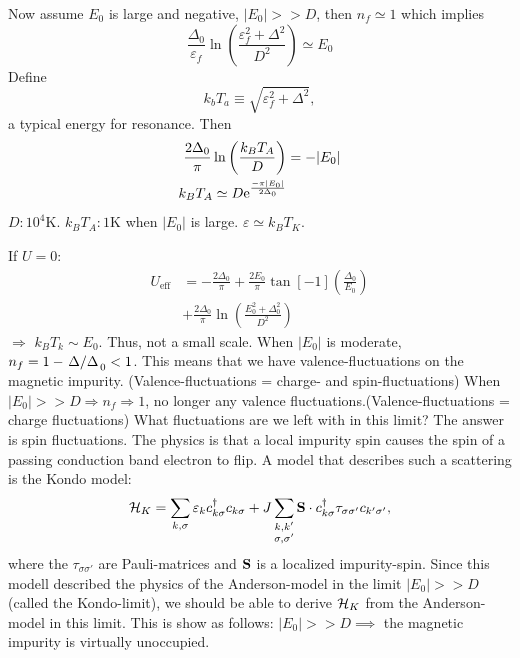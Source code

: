 Now assume $E_0$ is large and negative, $|E_0|>>D$, then $n_f \simeq 1$ which implies
\begin{equation*}
	\frac{\Delta_0}{\varepsilon_f}\ln\left(\frac{\varepsilon_f^2 + \Delta^2}{D^2}\right) \simeq E_0
\end{equation*}
Define 
\begin{equation}
	k_bT_a \equiv \sqrt{\varepsilon_f^2 + \Delta^2},
\end{equation}
a typical energy for resonance. Then
\begin{align*}
\frac{2\Delta_0}{\pi}\ln\left(\frac{k_BT_A}{D}\right) &= -|E_0| \\
k_BT_A\simeq D\mathrm{e}^{\frac{-\pi|E_0|}{2\Delta_0}}
\end{align*}
$D: 10^4\mathrm{K}$. $k_BT_A: 1\mathrm{K}$ when $|E_0|$ is large. $\varepsilon\simeq k_BT_K$.

If $U=0$: 
\begin{align}
	U_\text{eff} &= -\frac{2\Delta_0}{\pi} + \frac{2E_0}{\pi}\tan[-1](\frac{\Delta_0}{E_0}) \\
	&+\frac{2\Delta_0}{\pi}\ln\left(\frac{E_0^2 + \Delta_0^2}{D^2}\right)
\end{align}
$\Rightarrow$ $k_BT_k \sim E_0$. Thus, not a small scale. When $|E_0|$ is moderate, $n_f = 1-\flatfrac{\Delta}\Delta_0<1$. This means that we have valence-fluctuations on the magnetic impurity. (Valence-fluctuations = charge- and spin-fluctuations) When $|E_0| >> D \Rightarrow n_f\Rightarrow1$, no longer any valence fluctuations.(Valence-fluctuations = charge fluctuations) What fluctuations are we left with in this limit? The answer is spin fluctuations. The physics is that a local impurity spin causes the spin of a passing conduction band electron to flip. A model that describes such a scattering is the Kondo model:
\begin{equation}
\mathcal{H}_K  = \sum_{k,\sigma}\varepsilon_kc_{k\sigma}^\dagger c_{k\sigma} + J\sum_{\substack{k,k' \\ \sigma,\sigma'}}\vb{S}\cdot c_{k\sigma}^\dagger \tau_{\sigma\sigma'}c_{k'\sigma'},
\end{equation}
where the \(\tau	_{\sigma\sigma'}\) are Pauli-matrices and \(\vb{S}\) is a localized impurity-spin. Since this modell described the physics of the Anderson-model in the limit \( |E_0| >> D \) (called the Kondo-limit), we should be able to derive \(\mathcal{H}_K\) from the Anderson-model in this limit. This is show as follows: 
\(|E_0|>>D  \implies \) the magnetic impurity is virtually unoccupied.


